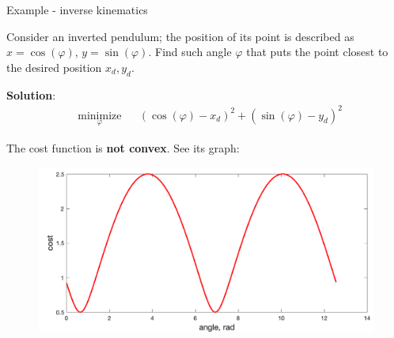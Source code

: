 \documentclass{beamer}
\begin{document}
\begin{frame}{Example - inverse kinematics}
	\begin{flushleft}
		
		Consider an inverted pendulum; the position of its point is described as $x = \cos(\varphi)$, $y = \sin(\varphi)$. Find such angle $\varphi$ that puts the point closest to the desired position $x_d, y_d$.
		
		\bigskip
		
		\textbf{Solution}:
		\begin{equation}
			\begin{aligned}
				& \underset{\varphi}{\text{minimize}}
				& & (\cos(\varphi)-x_d)^2 + 
				(\sin(\varphi)-y_d)^2
			\end{aligned}
		\end{equation}
		
		The cost function is \textbf{not convex}. See its graph:
		
		\begin{figure}
			\centering
			\includegraphics[height=0.4\textheight]{NonConvex}
		\end{figure}
		
		
		
	\end{flushleft}
\end{frame}




\myqrframe
\end{document}
